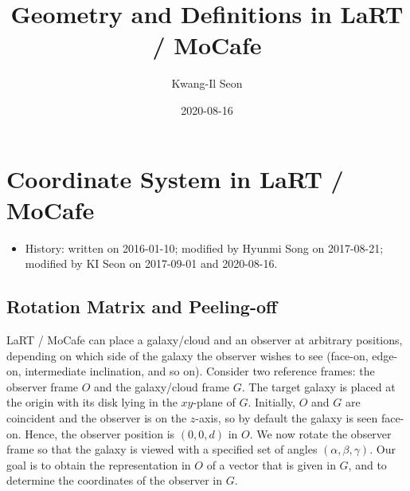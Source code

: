 \documentclass[english,a4paper]{kiseon_memo}
\begin{document}
\title{Geometry and Definitions in LaRT / MoCafe}
\author{Kwang-Il Seon}
\date{2020-08-16}
\maketitle

\tableofcontents
\bigskip

\section{Coordinate System in LaRT / MoCafe}
\begin{itemize}
\item History: written on 2016-01-10; modified by Hyunmi Song on 2017-08-21;
  modified by KI Seon on 2017-09-01 and 2020-08-16.
\end{itemize}

\subsection{Rotation Matrix and Peeling-off}

LaRT / MoCafe can place a galaxy/cloud and an observer at arbitrary
positions, depending on which side of the galaxy the observer wishes
to see (face-on, edge-on, intermediate inclination, and so on).
Consider two reference frames: the observer frame $O$ and the
galaxy/cloud frame $G$. The target galaxy is placed at the origin
with its disk lying in the $xy$-plane of $G$. Initially, $O$ and $G$
are coincident and the observer is on the $z$-axis, so by default
the galaxy is seen face-on. Hence, the observer position is
$(0,0,d)$ in $O$. We now rotate the observer frame so that the
galaxy is viewed with a specified set of angles
$(\alpha, \beta, \gamma)$. Our goal is to obtain the representation
in $O$ of a vector that is given in $G$, and to determine the
coordinates of the observer in $G$.
\end{document}
